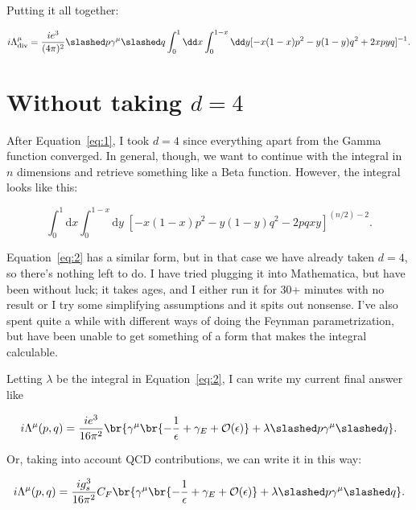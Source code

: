 \documentclass[titlepage]{article}
\begin{document}
Putting it all together:

\begin{equation}
  \label{eq:2}
  i\Lambda^\mu_{\mathrm{div}} = \frac{ie^3}{(4\pi)^2} \psl\gamma^\mu\qsl \int_0^1 \dd x \int_0^{1-x} \dd y [-x(1-x)p^2 - y(1-y)q^2 + 2xpyq]^{-1}.
\end{equation}



\section{Without taking \texorpdfstring{$d=4$}{d=4}}

After Equation~\eqref{eq:1}, I took $d=4$ since everything apart from the Gamma function converged. In general, though, we want to continue with the integral in $n$ dimensions and retrieve something like a Beta function. However, the integral looks like this:

\begin{equation}
  \int_0^1\mathrm{d}x \int_0^{1-x}\mathrm{d}y \; [-x(1-x)p^2 -y(1-y)q^2 - 2pqxy]^{(n/2)-2}.
\end{equation}

Equation~\eqref{eq:2} has a similar form, but in that case we have already taken $d=4$, so there's nothing left to do. I have tried plugging it into Mathematica, but have been without luck; it takes ages, and I either run it for 30+ minutes with no result or I try some simplifying assumptions and it spits out nonsense. I've also spent quite a while with different ways of doing the Feynman parametrization, but have been unable to get something of a form that makes the integral calculable.

Letting $\lambda$ be the integral in Equation~\eqref{eq:2}, I can write my current final answer like

\begin{equation}
  i\Lambda^\mu(p,q) = \frac{ie^3}{16\pi^2}\br{\gamma^\mu \br{- \frac{1}{\epsilon} + \gamma_E + \mathcal{O}(\epsilon)} + \lambda\psl\gamma^\mu\qsl}.
\end{equation}

Or, taking into account QCD contributions, we can write it in this way:

\begin{equation}
  i\Lambda^\mu(p,q) = \frac{ig_s^3}{16\pi^2}C_F\br{\gamma^\mu \br{- \frac{1}{\epsilon} + \gamma_E + \mathcal{O}(\epsilon)} + \lambda\psl\gamma^\mu\qsl}.
\end{equation}
\end{document}
